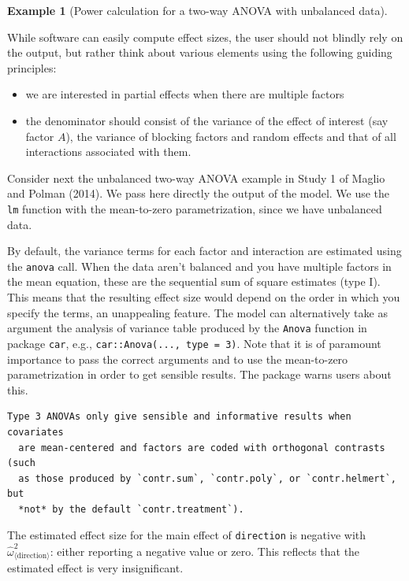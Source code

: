 \documentclass[
  11pt,
  letterpaper,
]{scrbook}
\providecommand{\tightlist}{%
  \setlength{\itemsep}{0pt}\setlength{\parskip}{0pt}}\usepackage{longtable,booktabs,array}
\theoremstyle{definition}
\theoremstyle{definition}
\newtheorem{example}{Example}[chapter]
\theoremstyle{remark}
\begin{document}
\begin{example}[Power calculation for a two-way ANOVA with unbalanced
data]\protect\hypertarget{exm-power3}{}\label{exm-power3}

While software can easily compute effect sizes, the user should not
blindly rely on the output, but rather think about various elements
using the following guiding principles:

\begin{itemize}
\tightlist
\item
  we are interested in partial effects when there are multiple factors
\item
  the denominator should consist of the variance of the effect of
  interest (say factor \(A\)), the variance of blocking factors and
  random effects and that of all interactions associated with them.
\end{itemize}

Consider next the unbalanced two-way ANOVA example in Study 1 of Maglio
and Polman (2014). We pass here directly the output of the model. We use
the \texttt{lm} function with the mean-to-zero parametrization, since we
have unbalanced data.

By default, the variance terms for each factor and interaction are
estimated using the \texttt{anova} call. When the data aren't balanced
and you have multiple factors in the mean equation, these are the
sequential sum of square estimates (type I). This means that the
resulting effect size would depend on the order in which you specify the
terms, an unappealing feature. The model can alternatively take as
argument the analysis of variance table produced by the \texttt{Anova}
function in package \texttt{car}, e.g.,
\texttt{car::Anova(...,\ type\ =\ 3)}. Note that it is of paramount
importance to pass the correct arguments and to use the mean-to-zero
parametrization in order to get sensible results. The package warns
users about this.

\begin{verbatim}
Type 3 ANOVAs only give sensible and informative results when covariates
  are mean-centered and factors are coded with orthogonal contrasts (such
  as those produced by `contr.sum`, `contr.poly`, or `contr.helmert`, but
  *not* by the default `contr.treatment`).
\end{verbatim}

The estimated effect size for the main effect of \texttt{direction} is
negative with \(\widehat{\omega}^2_{\langle \text{direction}\rangle}\):
either reporting a negative value or zero. This reflects that the
estimated effect is very insignificant.


\end{example}
\end{document}
